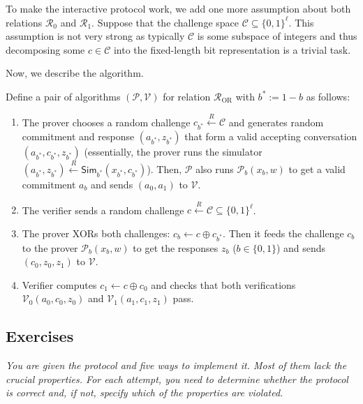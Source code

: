 \documentclass[../lecture-notes.tex]{subfiles}
\begin{document}
To make the interactive protocol work, we add one more assumption about both relations $\mathcal{R}_0$ and $\mathcal{R}_1$. Suppose that the challenge space $\mathcal{C} \subseteq \{0,1\}^{\ell}$. This assumption is not very strong as typically $\mathcal{C}$ is some subspace of integers and thus decomposing some $c \in \mathcal{C}$ into the fixed-length bit representation is a trivial task.

Now, we describe the algorithm.

\begin{definition}
    Define a pair of algorithms $(\mathcal{P},\mathcal{V})$ for relation $\mathcal{R}_{\text{OR}}$ with $b^* := 1-b$ as follows:
    \begin{enumerate}
        \item The prover chooses a random challenge $c_{b^*} \xleftarrow{R} \mathcal{C}$ and generates random commitment and response $(a_{b^*}, z_{b^*})$ that form a valid accepting conversation $(a_{b^*}, c_{b^*}, z_{b^*})$ (essentially, the prover runs the simulator $(a_{b^*}, z_{b^*}) \xleftarrow{R} \mathsf{Sim}_{b^*}(x_{b^*}, c_{b^*})$). Then, $\mathcal{P}$ also runs $\mathcal{P}_b(x_b, w)$ to get a valid commitment $a_b$ and sends $(a_0,a_1)$ to $\mathcal{V}$.
        \item The verifier sends a random challenge $c \xleftarrow{R} \mathcal{C} \subseteq \{0,1\}^{\ell}$.
        \item The prover XORs both challenges: $c_b \gets c \oplus c_{b^*}$. Then it feeds the challenge $c_b$ to the prover $\mathcal{P}_b(x_b,w)$ to get the responses $z_b$ ($b \in \{0,1\}$) and sends $(c_0,z_0,z_1)$ to $\mathcal{V}$.
        \item Verifier computes $c_1 \gets c \oplus c_0$ and checks that both verifications $\mathcal{V}_0(a_0,c_0,z_0)$ and $\mathcal{V}_1(a_1,c_1,z_1)$ pass.
    \end{enumerate}
\end{definition}

\newpage
\subsection*{Exercises}

    \textit{You are given the protocol and five ways to implement it. Most of them lack the crucial properties. For each attempt, you need to determine whether the protocol is correct and, if not, specify which of the properties are violated.}
 
\end{document}
